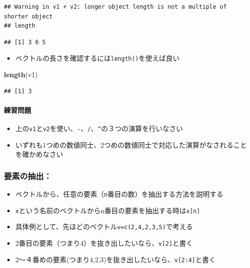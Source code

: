 \documentclass[
]{book}
\newenvironment{Shaded}{\begin{snugshade}}{\end{snugshade}}
\newcommand{\FunctionTok}[1]{\textcolor[rgb]{0.13,0.29,0.53}{\textbf{#1}}}
\newcommand{\NormalTok}[1]{#1}
\providecommand{\tightlist}{%
  \setlength{\itemsep}{0pt}\setlength{\parskip}{0pt}}
\begin{document}
\begin{verbatim}
## Warning in v1 + v2: longer object length is not a multiple of shorter object
## length
\end{verbatim}

\begin{verbatim}
## [1] 3 6 5
\end{verbatim}

\begin{itemize}
\tightlist
\item
  ベクトルの長さを確認するには\texttt{length()}を使えば良い
\end{itemize}

\begin{Shaded}
\begin{Highlighting}[]
\FunctionTok{length}\NormalTok{(v1)}
\end{Highlighting}
\end{Shaded}

\begin{verbatim}
## [1] 3
\end{verbatim}

\hypertarget{ux7df4ux7fd2ux554fux984c-3}{%
\paragraph*{練習問題}\label{ux7df4ux7fd2ux554fux984c-3}}

\begin{itemize}
\tightlist
\item
  上の\texttt{v1}と\texttt{v2}を使い、\texttt{-}、\texttt{/}、\texttt{\^{}}の３つの演算を行いなさい\\
\item
  いずれも1つめの数値同士、2つめの数値同士で対応した演算がなされることを確かめなさい
\end{itemize}

\hypertarget{ux8981ux7d20ux306eux62bdux51fa}{%
\subsubsection*{要素の抽出：}\label{ux8981ux7d20ux306eux62bdux51fa}}

\begin{itemize}
\item
  ベクトルから、任意の要素（\texttt{n}番目の数）を抽出する方法を説明する
\item
  \texttt{x}という名前のベクトルからn番目の要素を抽出する時は\texttt{x{[}n{]}}
\item
  具体例として、先ほどのベクトル\texttt{v=c(2,4,2,3,5)}で考える
\item
  2番目の要素（つまり4）を抜き出したいなら、\texttt{v{[}2{]}}と書く
\item
  2〜４番めの要素(つまり4,2,3)を抜き出したいなら、\texttt{v{[}2:4{]}}と書く
\end{itemize}
\end{document}

